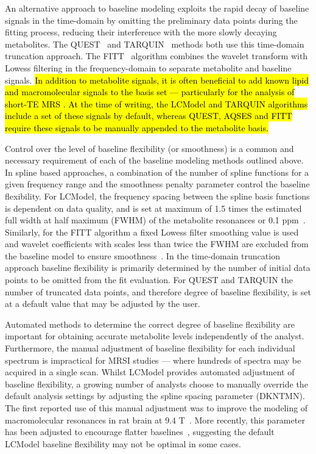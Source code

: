 \documentclass[num-refs]{wiley-article}
\newcommand{\revone}[2]{\hl{#1}\marginnote{\hl{#2}}}
\begin{document}
An alternative approach to baseline modeling exploits the rapid decay of baseline signals in the time-domain by omitting the preliminary data points during the fitting process, reducing their interference with the more slowly decaying metabolites. The QUEST~\cite{Ratiney2005} and TARQUIN~\cite{Wilson2011} methods both use this time-domain truncation approach. The FITT~\cite{Young1998} algorithm combines the wavelet transform with Lowess filtering in the frequency-domain to separate metabolite and baseline signals. \revone{In addition to metabolite signals, it is often beneficial to add known lipid and macromolecular signals to the basis set --- particularly for the analysis of short-TE MRS \cite{Seeger2003}. At the time of writing, the LCModel and TARQUIN algorithms include a set of these signals by default, whereas QUEST, AQSES and FITT require these signals to be manually appended to the metabolite basis.}{R2.3}

Control over the level of baseline flexibility (or smoothness) is a common and necessary requirement of each of the baseline modeling methods outlined above. In spline based approaches, a combination of the number of spline functions for a given frequency range and the smoothness penalty parameter control the baseline flexibility. For LCModel, the frequency spacing between the spline basis functions is dependent on data quality, and is set at maximum of 1.5 times the estimated full width at half maximum (FWHM) of the metabolite resonances or 0.1 ppm~\cite{Provencher1993}. Similarly, for the FITT algorithm a fixed Lowess filter smoothing value is used and wavelet coefficients with scales less than twice the FWHM are excluded from the baseline model to ensure smoothness~\cite{Young1998}. In the time-domain truncation approach baseline flexibility is primarily determined by the number of initial data points to be omitted from the fit evaluation. For QUEST and TARQUIN the number of truncated data points, and therefore degree of baseline flexibility, is set at a default value that may be adjusted by the user.

Automated methods to determine the correct degree of baseline flexibility are important for obtaining accurate metabolite levels independently of the analyst. Furthermore, the manual adjustment of baseline flexibility for each individual spectrum is impractical for MRSI studies --- where hundreds of spectra may be acquired in a single scan. Whilst LCModel provides automated adjustment of baseline flexibility, a growing number of analysts choose to manually override the default analysis settings by adjusting the spline spacing parameter (DKNTMN). The first reported use of this manual adjustment was to improve the modeling of macromolecular resonances in rat brain at 9.4 T~\cite{Pfeuffer1999}. More recently, this parameter has been adjusted to encourage flatter baselines~\cite{Deelchand2016,Terpstra2010,Marjanska2018}, suggesting the default LCModel baseline flexibility may not be optimal in some cases.
\end{document}
